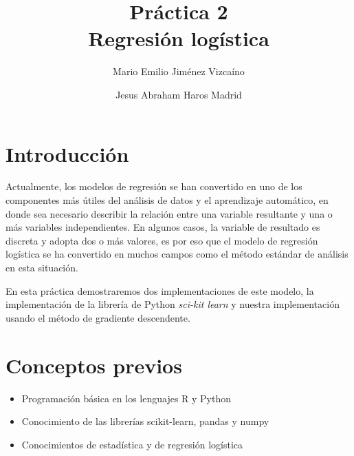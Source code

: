 \documentclass[sigconf,authorversion,nonacm]{acmart}
\begin{document}
\title{Práctica 2 \\ Regresión logística}

\author{Mario Emilio Jiménez Vizcaíno}

\author{Jesus Abraham Haros Madrid}


\begin{abstract}
\end{abstract}

\maketitle

\section{Introducción}
Actualmente, los modelos de regresión se han convertido en uno de los componentes más útiles del análisis de datos y el aprendizaje automático, en donde sea necesario describir la relación entre una variable resultante y una o más variables independientes. En algunos casos, la variable de resultado es discreta y adopta dos o más valores, es por eso que el modelo de regresión logística se ha convertido en muchos campos como el método estándar de análisis en esta situación.\cite{hosmer2013applied}

En esta práctica demostraremos dos implementaciones de este modelo, la implementación de la librería de Python \textit{sci-kit learn} y nuestra implementación usando el método de gradiente descendente.


\section{Conceptos previos}
\begin{itemize}
  \item Programación básica en los lenguajes R y Python
  \item Conocimiento de las librerías scikit-learn, pandas y numpy
  \item Conocimientos de estadística y de regresión logística
\end{itemize}
\end{document}
